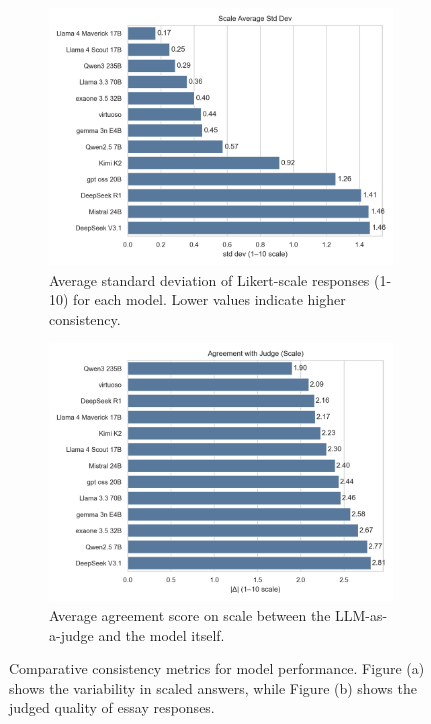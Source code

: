 \documentclass[11pt]{article}
\begin{document}
\begin{figure}[htbp]
    \centering
    \begin{subfigure}[b]{0.495\textwidth}
        \centering
        \includegraphics[width=\textwidth]{../analysis_reports/A4_model_scale_avg_std.png}
        \caption{Average standard deviation of Likert-scale responses (1-10) for each model. Lower values indicate higher consistency.}
        \label{fig:model_scale_avg_std}
    \end{subfigure}
    \hfill
    \begin{subfigure}[b]{0.495\textwidth}
        \centering
        \includegraphics[width=\textwidth]{../analysis_reports/F1_best_models_judge_agreement.png}
        \caption{Average agreement score on scale between the LLM-as-a-judge and the model itself.}
        \label{fig:model_judge_avg_std}
    \end{subfigure}
    \caption{Comparative consistency metrics for model performance. Figure (a) shows the variability in scaled answers, while Figure (b) shows the judged quality of essay responses.}
    \label{fig:side_by_side_consistency}
\end{figure}
\end{document}
